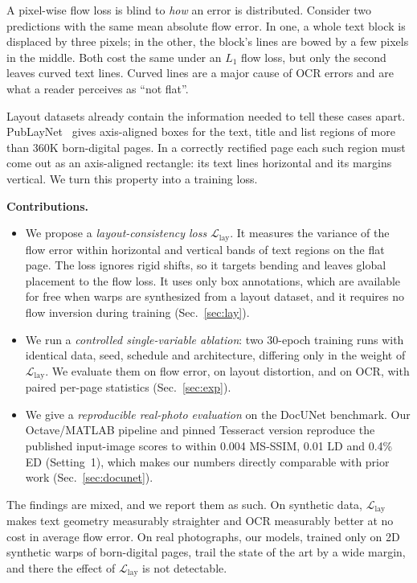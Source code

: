 \documentclass[a4paper,fleqn]{cas-sc}
\newcommand{\Llay}{\mathcal{L}_{\mathrm{lay}}}
\begin{document}
A pixel-wise flow loss is blind to \emph{how} an error is distributed. Consider two predictions with the same mean absolute flow error. In one, a whole text block is displaced by three pixels; in the other, the block's lines are bowed by a few pixels in the middle. Both cost the same under an $L_1$ flow loss, but only the second leaves curved text lines. Curved lines are a major cause of OCR errors and are what a reader perceives as ``not flat''.

Layout datasets already contain the information needed to tell these cases apart. PubLayNet~\cite{zhong2019publaynet} gives axis-aligned boxes for the text, title and list regions of more than 360K born-digital pages. In a correctly rectified page each such region must come out as an axis-aligned rectangle: its text lines horizontal and its margins vertical. We turn this property into a training loss.

\textbf{Contributions.}
\begin{itemize}
\item We propose a \emph{layout-consistency loss} $\Llay$. It measures the variance of the flow error within horizontal and vertical bands of text regions on the flat page. The loss ignores rigid shifts, so it targets bending and leaves global placement to the flow loss. It uses only box annotations, which are available for free when warps are synthesized from a layout dataset, and it requires no flow inversion during training (Sec.~\ref{sec:lay}).
\item We run a \emph{controlled single-variable ablation}: two 30-epoch training runs with identical data, seed, schedule and architecture, differing only in the weight of $\Llay$. We evaluate them on flow error, on layout distortion, and on OCR, with paired per-page statistics (Sec.~\ref{sec:exp}).
\item We give a \emph{reproducible real-photo evaluation} on the DocUNet benchmark. Our Octave/MATLAB pipeline and pinned Tesseract version reproduce the published input-image scores to within 0.004 MS-SSIM, 0.01 LD and 0.4\% ED (Setting~1), which makes our numbers directly comparable with prior work (Sec.~\ref{sec:docunet}).
\end{itemize}

The findings are mixed, and we report them as such. On synthetic data, $\Llay$ makes text geometry measurably straighter and OCR measurably better at no cost in average flow error. On real photographs, our models, trained only on 2D synthetic warps of born-digital pages, trail the state of the art by a wide margin, and there the effect of $\Llay$ is not detectable.
\end{document}
